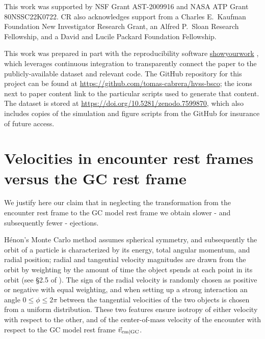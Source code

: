 \documentclass[twocolumn]{aastex631}
\newcommand{\CMC}{\texttt{CMC}}
\newcommand{\fewbody}{\texttt{Fewbody}}
\begin{document}
\begin{acknowledgements}
This work was supported by NSF Grant AST-2009916 and NASA ATP Grant 80NSSC22K0722.
CR also acknowledges support from a Charles E.~Kaufman Foundation New Investigator Research Grant, an Alfred P.~Sloan Research Fellowship, and a David and Lucile Packard Foundation Fellowship.
\end{acknowledgements}

\software{\CMC\ \citep{2000ApJ...540..969J, 2013ApJS..204...15P, Rodriguez2022}, \fewbody \citep{2004MNRAS.352....1F}, \texttt{galpy} \citep{2015ApJS..216...29B}, \texttt{astropy} \citep{2013A&A...558A..33A, 2018AJ....156..123A, 2022ApJ...935..167A}, \texttt{numpy} \citep{harris2020array}, \texttt{pandas} \citep{mckinney-proc-scipy-2010, reback2020pandas}, \texttt{matplotlib} \citep{Hunter:2007}}

This work was prepared in part with the reproducibility software \href{https://github.com/showyourwork/showyourwork}{showyourwork} \citep{2021arXiv211006271L}, which leverages continuous integration to transparently connect the paper to the publicly-available dataset and relevant code.
The GitHub repository for this project can be found at \url{https://github.com/tomas-cabrera/hvss-bsco}; the icons next to paper content link to the particular scripts used to generate that content.
The dataset is stored at \url{https://doi.org/10.5281/zenodo.7599870}, which also includes copies of the simulation and figure scripts from the GitHub for insurance of future access.

\appendix

\section{Velocities in encounter rest frames versus the GC rest frame} \label{app:restframe}

We justify here our claim that in neglecting the transformation from the encounter rest frame to the GC model rest frame we obtain slower - and subsequently fewer - ejections.

H\'enon's Monte Carlo method assumes spherical symmetry, and subsequently the orbit of a particle is characterized by its energy, total angular momentum, and radial position; radial and tangential velocity magnitudes are drawn from the orbit by weighting by the amount of time the object spends at each point in its orbit (see \S2.5 of \citet{Rodriguez2022}).
The sign of the radial velocity is randomly chosen as positive or negative with equal weighting, and when setting up a strong interaction an angle $0 \le \phi \le 2\pi$ between the tangential velocities of the two objects is chosen from a uniform distribution.
These two features ensure isotropy of either velocity with respect to the other, and of the center-of-mass velocity of the encounter with respect to the GC model rest frame $\vec{v}_{\rm cm|GC}$.
\end{document}
